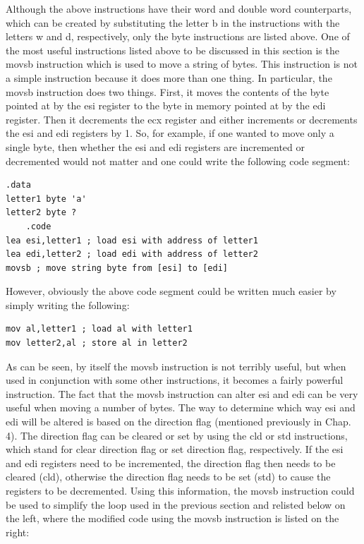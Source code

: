 \documentclass[10pt]{book}
\begin{document}
Although the above instructions have their word and double word counterparts, which can be created by substituting the letter b in the instructions with the letters w and d, respectively, only the byte instructions are listed above. One of the most useful instructions listed above to be discussed in this section is the movsb instruction which is used to move a string of bytes. This instruction is not a simple instruction because it does more than one thing. In particular, the movsb instruction does two things. First, it moves the contents of the byte pointed at by the esi register to the byte in memory pointed at by the edi register. Then it decrements the ecx register and either increments or decrements the esi and edi registers by 1. So, for example, if one wanted to move only a single byte, then whether the esi and edi registers are incremented or decremented would not matter and one could write the following code segment:
\begin{verbatim}
.data
letter1 byte 'a'
letter2 byte ?
    .code
lea esi,letter1 ; load esi with address of letter1
lea edi,letter2 ; load edi with address of letter2
movsb ; move string byte from [esi] to [edi]
\end{verbatim}

However, obviously the above code segment could be written much easier by simply writing the following:

\begin{verbatim}
mov al,letter1 ; load al with letter1
mov letter2,al ; store al in letter2
\end{verbatim}

As can be seen, by itself the movsb instruction is not terribly useful, but when used in conjunction with some other instructions, it becomes a fairly powerful instruction. The fact that the movsb instruction can alter esi and edi can be very useful when moving a number of bytes. The way to determine which way esi and edi will be altered is based on the direction flag (mentioned previously in Chap. 4). The direction flag can be cleared or set by using the cld or std instructions, which stand for clear direction flag or set direction flag, respectively. If the esi and edi registers need to be incremented, the direction flag then needs to be cleared (cld), otherwise the direction flag needs to be set (std) to cause the registers to be decremented. Using this information, the movsb instruction could be used to simplify the loop used in the previous section and relisted below on the left, where the modified code using the movsb instruction is listed on the right:
\end{document}
